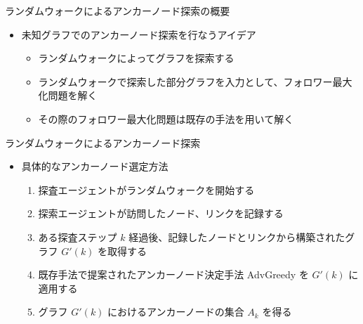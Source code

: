\documentclass[compress,dvipdfmx,11pt]{beamer}
\begin{document}
\begin{frame}[label={sec:org27a6bc8}]{ランダムウォークによるアンカーノード探索の概要}
\begin{itemize}
\item 未知グラフでのアンカーノード探索を行なうアイデア
\begin{itemize}
\item ランダムウォークによってグラフを探索する
\item ランダムウォークで探索した部分グラフを入力として、フォロワー最大化問題を解く
\item その際のフォロワー最大化問題は既存の手法を用いて解く
\end{itemize}
\end{itemize}
\end{frame}
\begin{frame}[label={sec:orgf33e666}]{ランダムウォークによるアンカーノード探索}
\begin{itemize}
\item 具体的なアンカーノード選定方法
\begin{enumerate}
\item 探査エージェントがランダムウォークを開始する
\item 探索エージェントが訪問したノード、リンクを記録する
\item ある探査ステップ \(k\) 経過後、記録したノードとリンクから構築されたグラフ \(G'(k)\) を取得する
\item 既存手法で提案されたアンカーノード決定手法 AdvGreedy を \(G'(k)\) に適用する
\item グラフ \(G'(k)\) におけるアンカーノードの集合 \(A_k\) を得る
\end{enumerate}
\end{itemize}
\end{frame}
\end{document}
